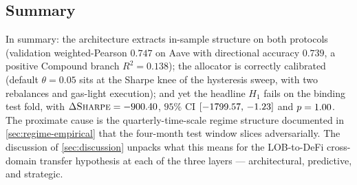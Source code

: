 \subsection{Summary}
\label{sec:defi-summary}

In summary: the architecture extracts in-sample structure on both
protocols (validation weighted-Pearson $0.747$ on Aave with
directional accuracy $0.739$, a positive Compound branch
$R^{2}=0.138$); the allocator is correctly calibrated (default
$\theta=0.05$ sits at the Sharpe knee of the hysteresis sweep, with
two rebalances and gas-light execution); and yet the headline $H_1$
fails on the binding test fold, with
$\Delta\textsc{Sharpe}=-900.40{}$, $95\%$ CI
$[-1799.57{},\,-1.23{}]$ and
$p=1.00{}$. The proximate cause is the
quarterly-time-scale regime structure documented in
\cref{sec:regime-empirical} that the four-month test window slices
adversarially. The discussion of \cref{sec:discussion} unpacks what
this means for the LOB-to-DeFi cross-domain transfer hypothesis at
each of the three layers --- architectural, predictive, and
strategic.
